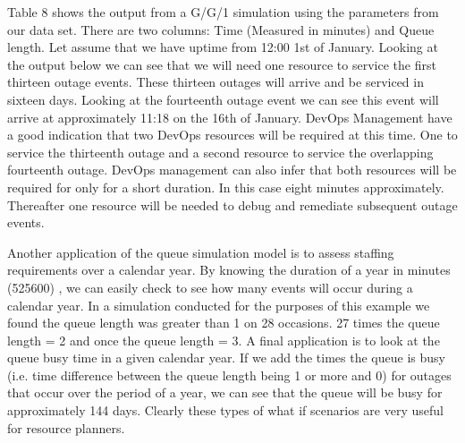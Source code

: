 \documentclass[5p]{elsarticle}
\begin{document}
Table 8 shows the output from a G/G/1 simulation using the parameters from our data set. There are two columns: Time (Measured in minutes) and Queue length. Let assume that  we have uptime from 12:00 1st of January. Looking at the output below we can see that we will need one resource to service the first  thirteen outage events. These thirteen outages will arrive and be serviced in sixteen days. Looking at the fourteenth outage event we can see this event will arrive at approximately 11:18 on the 16th of January. DevOps Management have a good indication that two DevOps resources will be required at this time.  One to service the thirteenth outage and a second resource to service the overlapping fourteenth outage. DevOps management can also infer that both resources will be required for only for a short duration. In this case eight minutes approximately. Thereafter one resource will be needed to debug and remediate subsequent outage events.

Another application of the queue simulation model is to assess staffing requirements over a calendar year. By knowing the duration of a year in minutes (525600) , we can easily check to see how many events will occur during a calendar year. In a simulation conducted for the purposes of this example we found the queue length was greater than 1 on 28 occasions. 27 times the queue length = 2 and once the queue length = 3. A final application is to look at the queue busy time in a given calendar year. If we add the times the queue is busy (i.e. time difference between the queue length being 1 or more and 0) for outages that occur over the period of a year, we can see that the queue will be busy for approximately 144 days. Clearly these types of what if scenarios are very useful for resource planners.
\end{document}
